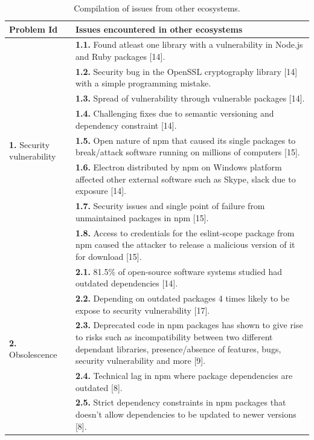 \documentclass[conference]{IEEEtran}
\begin{document}
\begin{table}[!t]
    \caption{Compilation of issues from other ecosystems.}
    \label{tab:compiled_issues}
    \begin{tabular}{|p{3cm}|p{14cm}|}
        \hline
        \textbf{Problem Id} & \textbf{Issues encountered in other ecosystems} \\
        \hline
        \multirow{8}{*}{\textbf{1.} Security vulnerability} &  \textbf{1.1.} Found atleast one library with a vulnerability in Node.js and Ruby packages [14].\\
							&  \textbf{1.2.} Security bug in the OpenSSL cryptography library [14] with a simple programming mistake. \\
							&  \textbf{1.3.} Spread of vulnerability  through vulnerable packages [14].  \\
							&  \textbf{1.4.} Challenging fixes due to semantic versioning and dependency constraint [14].\\
							&  \textbf{1.5.} Open nature of npm that caused its single packages to break/attack software running on millions of computers [15].\\
							&  \textbf{1.6.} Electron distributed by npm on Windows platform affected other external software such as Skype,  slack due to exposure [14]. \\
							&  \textbf{1.7.} Security issues and single point of failure from unmaintained packages in npm [15].\\
							&  \textbf{1.8.} Access to credentials for the eslint-scope package from npm  caused the attacker to release a malicious version of it for download [15].  \\			
        \hline
        \multirow{7}{*}{\textbf{2.} Obsolescence} &\textbf{2.1.} 81.5\% of open-source software systems studied had outdated dependencies [14].  \\
					      & \textbf{2.2.} Depending on outdated packages 4 times likely to  be expose to security vulnerability [17].  \\
					      & \textbf{2.3.} Deprecated code in npm packages has shown to give rise to risks such as incompatibility between two different dependant libraries, presence/absence of features, bugs, security vulnerability and more [9]. \\
					      & \textbf{2.4.} Technical lag in npm where package dependencies are outdated [8].  \\
					      & \textbf{2.5.} Strict dependency constraints in npm packages that doesn’t allow dependencies to be updated to newer versions [8].  \\

\end{tabular}
\end{table}
\end{document}
